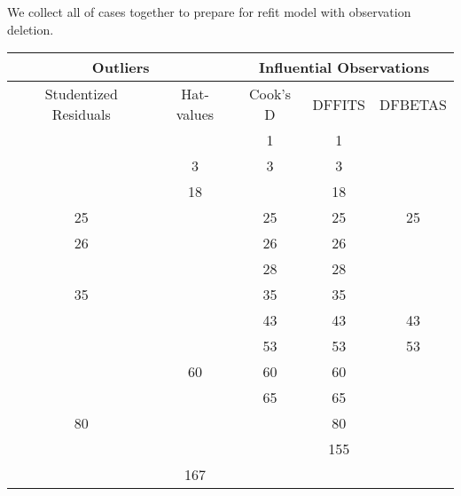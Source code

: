 \documentclass[a4paper]{article}
\begin{document}
\noindent
We collect all of cases together to prepare for refit model with observation deletion.
\begin{table}[!htb]
\centering
\begin{tabular}{ccccc}
\toprule
\multicolumn{2}{c}{Outliers}       & \multicolumn{3}{c}{Influential Observations} \\
\midrule
Studentized Residuals & Hat-values & Cook's D       & DFFITS       & DFBETAS      \\
\midrule
                      &            & 1              & 1            &              \\
                      \midrule
                      & 3          & 3              & 3            &              \\
                      \midrule
                      & 18         &                & 18           &              \\
                      \midrule
25                    &            & 25             & 25           & 25           \\
\midrule
26                    &            & 26             & 26           &              \\
\midrule
                      &            & 28             & 28           &              \\
                      \midrule
35                    &            & 35             & 35           &              \\
\midrule
                      &            & 43             & 43           & 43           \\
                      \midrule
                      &            & 53             & 53           & 53           \\
                      \midrule
                      & 60         & 60             & 60           &              \\
                      \midrule
                      &            & 65             & 65           &              \\
                      \midrule
80                    &            &                & 80           &              \\
\midrule

                      &            &                & 155          &              \\
                      \midrule
                      & 167        &                &              &              \\
\bottomrule
\end{tabular}
\end{table}
\end{document}
